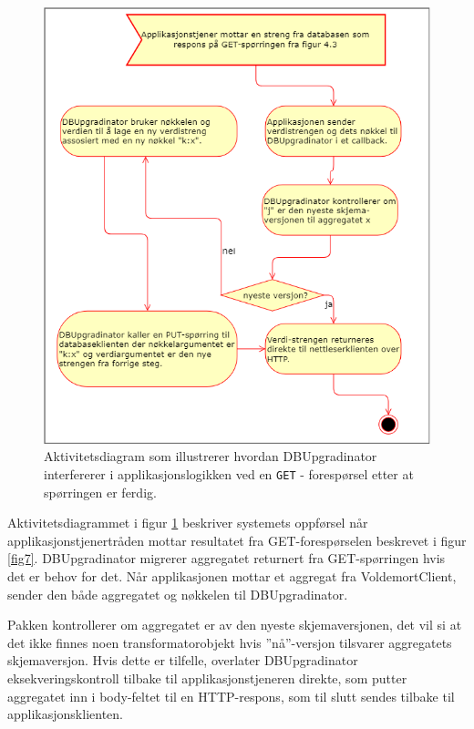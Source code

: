 \begin{figure}[hbtp]
    \centering
    \includegraphics[scale=0.5]{fig/dbupgradinator-prosess-2.png}
    \caption{Aktivitetsdiagram som illustrerer hvordan DBUpgradinator interfererer i applikasjonslogikken ved en \texttt{GET} - forespørsel etter at spørringen er ferdig.}
    \label{fig8}
\end{figure}

Aktivitetsdiagrammet i figur \ref{fig8} beskriver systemets oppførsel når applikasjons\-tjener\-tråden mottar resultatet fra GET-forespørselen beskrevet i figur \ref{fig7}. DBUpgradinator migrerer aggregatet returnert fra GET-spørringen hvis det er behov for det. Når applikasjonen mottar et aggregat fra VoldemortClient, sender den både aggregatet og nøkkelen til DBUpgradinator.

Pakken kontrollerer om aggregatet er av den nyeste skjemaversjonen, det vil si at det ikke finnes noen transformatorobjekt hvis ''nå''-versjon tilsvarer aggregatets skjemaversjon. Hvis dette er tilfelle, overlater DBUpgradinator eksekveringskontroll tilbake til applikasjonstjeneren direkte, som putter aggregatet inn i body-feltet til en HTTP-respons, som til slutt sendes tilbake til applikasjonsklienten.

